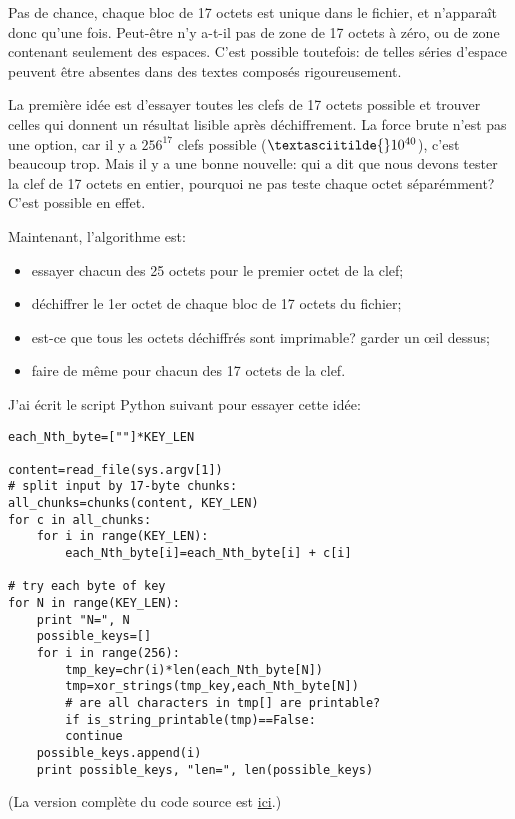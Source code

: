 Pas de chance, chaque bloc de 17 octets est unique dans le fichier, et n'apparaît
donc qu'une fois.
Peut-être n'y a-t-il pas de zone de 17 octets à zéro, ou de zone contenant seulement
des espaces.
C'est possible toutefois: de telles séries d'espace peuvent être absentes dans des
textes composés rigoureusement.

La première idée est d'essayer toutes les clefs de 17 octets possible et trouver
celles qui donnent un résultat lisible après déchiffrement.
La force brute n'est pas une option, car il y a $256^{17}$ clefs possible ($\textasciitilde{}10^{40}$),
c'est beaucoup trop.
Mais il y a une bonne nouvelle: qui a dit que nous devons tester la clef de 17 octets
en entier, pourquoi ne pas teste chaque octet séparémment?
C'est possible en effet.

Maintenant, l'algorithme est:

\begin{itemize}
\item essayer chacun des 25 octets pour le premier octet de la clef;
\item déchiffrer le 1er octet de chaque bloc de 17 octets du fichier;
\item est-ce que tous les octets déchiffrés sont imprimable? garder un \oe{}il dessus;
\item faire de même pour chacun des 17 octets de la clef.
\end{itemize}

J'ai écrit le script Python suivant pour essayer cette idée:

\begin{lstlisting}[caption=Python script,style=custompy]
each_Nth_byte=[""]*KEY_LEN

content=read_file(sys.argv[1])
# split input by 17-byte chunks:
all_chunks=chunks(content, KEY_LEN)
for c in all_chunks:
    for i in range(KEY_LEN):
        each_Nth_byte[i]=each_Nth_byte[i] + c[i]

# try each byte of key
for N in range(KEY_LEN):
    print "N=", N
    possible_keys=[]
    for i in range(256):
        tmp_key=chr(i)*len(each_Nth_byte[N])
        tmp=xor_strings(tmp_key,each_Nth_byte[N])
        # are all characters in tmp[] are printable?
        if is_string_printable(tmp)==False:
	    continue
	possible_keys.append(i)
    print possible_keys, "len=", len(possible_keys)
\end{lstlisting}

(La version complète du code source est
 \href{\GitHubBlobMasterURL/ff/XOR/mask_2/files/decrypt2.py}{ici}.)

